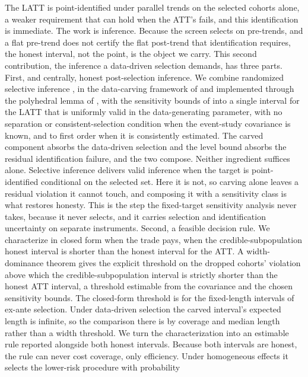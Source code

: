 \documentclass[12pt]{article}
\theoremstyle{remark}
\begin{document}
The LATT is point-identified under parallel trends on the selected cohorts alone, a weaker requirement that
can hold when the ATT's fails, and this identification is immediate. The work is inference. Because the
screen selects on pre-trends, and a flat pre-trend does not certify the flat post-trend that identification
requires, the honest interval, not the point, is the object we carry. This second contribution, the
inference a data-driven selection demands, has three parts. First, and centrally, honest post-selection
inference. We combine randomized selective inference \citep{tiantaylor2018}, in the data-carving framework
of \citet{fithian2014} and implemented through the polyhedral lemma of \citet{lee2016}, with the
sensitivity bounds of \citet{rambachan2023} into a single interval
for the LATT that is uniformly valid in the data-generating parameter, with no separation or
consistent-selection condition when the event-study covariance is known, and to first order when it is
consistently estimated. The carved component absorbs the data-driven
selection and the level bound absorbs the residual identification failure, and the two compose. Neither
ingredient suffices alone. Selective inference \citep{fithian2014, lee2016, tiantaylor2018} delivers valid
inference when the target is point-identified conditional on the selected set. Here it is not, so carving alone leaves a residual violation it
cannot touch, and composing it with a sensitivity class is what restores honesty. This is the step the
fixed-target sensitivity analysis never takes, because it never selects, and it carries selection and
identification uncertainty on separate instruments. Second, a feasible
decision rule.
We characterize in closed form when the trade pays, when the credible-subpopulation honest interval is
shorter than the honest interval for the ATT. A width-dominance theorem gives the explicit threshold on the dropped cohorts' violation
above which the credible-subpopulation interval is strictly shorter than the honest ATT interval, a
threshold estimable from the covariance and the chosen sensitivity bounds. The closed-form threshold is for
the fixed-length intervals of ex-ante selection. Under data-driven selection the carved interval's expected
length is infinite, so the comparison there is by coverage and median length rather than a
width threshold. We turn the characterization into an estimable rule reported alongside both
honest intervals. Because both intervals are honest, the rule can never cost
coverage, only efficiency. Under homogeneous effects it selects the lower-risk procedure with probability
\end{document}
